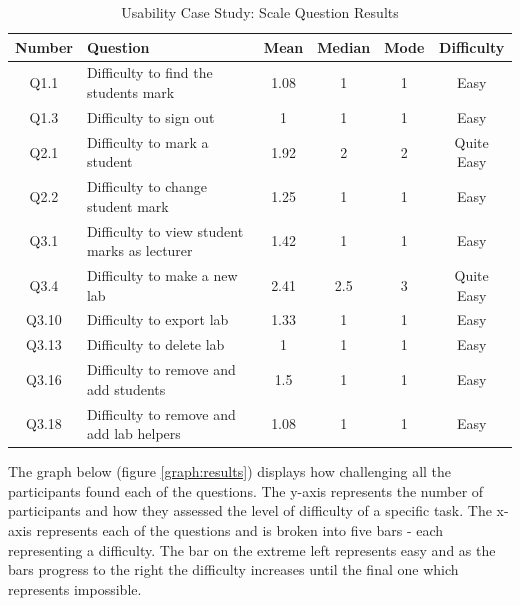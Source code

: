\documentclass[12pt]{article}  %
\begin{document}
\begin{spacing}{1.2}
\begin{longtable}{@{\extracolsep{\fill}}|c|l|c|c|c|c|}
\caption{Usability Case Study: Scale Question Results} \label{table:usability} \\ \hline

\textbf{Number} & \textbf{Question} & \textbf{Mean} & \textbf{Median} & \textbf{Mode} & \textbf{Difficulty}\\ \hline

Q1.1 & Difficulty to find the students mark & 1.08 & 1 & 1 & Easy\\ \hline
Q1.3 & Difficulty to sign out & 1 & 1 & 1 & Easy \\ \hline

Q2.1 & Difficulty to mark a student & 1.92 & 2 & 2 & Quite Easy \\ \hline
Q2.2 & Difficulty to change student mark & 1.25 & 1 & 1 &  Easy \\ \hline

Q3.1 & Difficulty to view student marks as lecturer & 1.42 & 1 & 1 &  Easy \\ \hline
Q3.4 & Difficulty to make a new lab & 2.41 & 2.5 & 3 & Quite Easy \\ \hline
Q3.10 & Difficulty to export lab & 1.33 & 1 & 1 &  Easy \\ \hline
Q3.13 & Difficulty to delete lab & 1 & 1 & 1 &  Easy \\ \hline
Q3.16 & Difficulty to remove and add students & 1.5 & 1 & 1 &  Easy \\ \hline
Q3.18 & Difficulty to remove and add lab helpers & 1.08 & 1 & 1 & Easy \\ \hline

\end{longtable}
\end{spacing}

\noindent The graph below (figure \ref{graph:results}) displays how challenging all the participants found each of the questions. The y-axis represents the number of participants and how they assessed the level of difficulty of a specific task. The x-axis represents each of the questions and is broken  into five bars - each representing a difficulty. The bar on the extreme left  represents easy and as the bars progress to the right the difficulty increases until the final one which represents impossible.  
\end{document}

